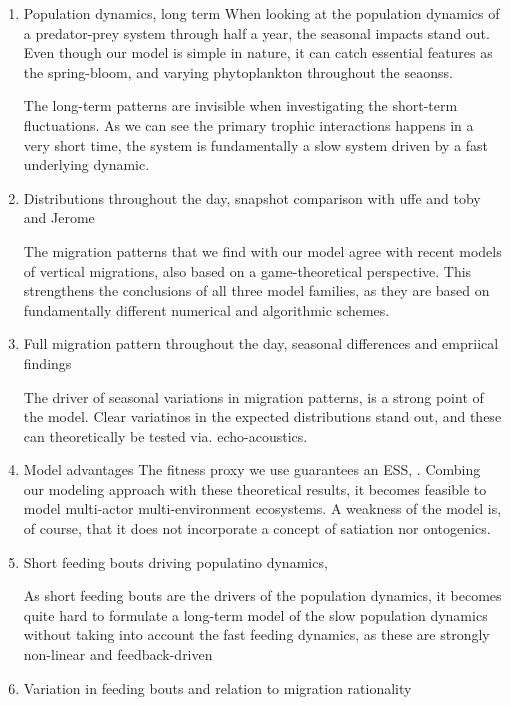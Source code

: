 \begin{enumerate}
\item Population dynamics, long term
  When looking at the population dynamics of a predator-prey system through half a year, the seasonal impacts stand out. Even though our model is simple in nature, it can catch essential features as the spring-bloom, and varying phytoplankton throughout the seaonss.

  The long-term patterns are invisible when investigating the short-term fluctuations. As we can see the primary trophic interactions happens in a very short time, the system is fundamentally a slow system driven by a fast underlying dynamic.

  \item Distributions throughout the day, snapshot comparison with uffe and toby and Jerome

The migration patterns that we find with our model agree with  recent models of vertical migrations, also based on a game-theoretical perspective. This strengthens the conclusions of all three model families, as they are based on fundamentally different numerical and algorithmic schemes.
  \item Full migration pattern throughout the day, seasonal differences and empriical findings

The driver of seasonal variations in migration patterns, is a strong point of the model. Clear variatinos in the expected distributions stand out, and these can theoretically be tested via. echo-acoustics.





  \item Model advantages
The fitness proxy we use guarantees an ESS, \citep{krivan}. Combing our modeling approach with these theoretical results, it becomes feasible to model multi-actor multi-environment ecosystems. A weakness of the model is, of course, that it does not incorporate a concept of satiation nor ontogenics.

  \item Short feeding bouts driving populatino dynamics,

As short feeding bouts are the drivers of the population dynamics, it becomes quite hard to formulate a long-term model of the slow population dynamics without taking into account the fast feeding dynamics, as these are strongly non-linear and feedback-driven
  \item Variation in feeding bouts and relation to migration rationality


\end{enumerate}
